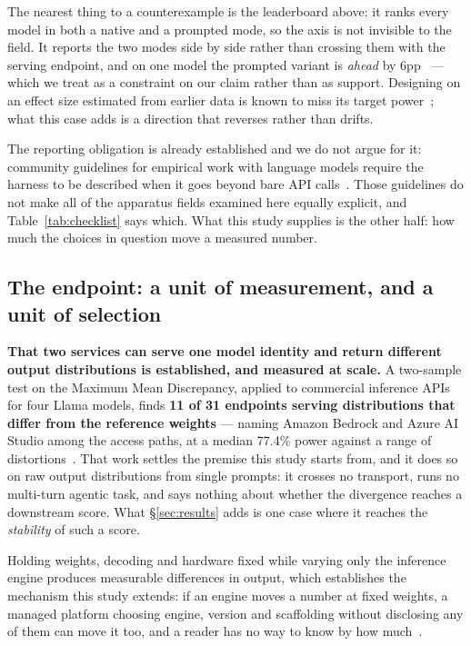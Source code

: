 The nearest thing to a counterexample is the leaderboard above: it ranks every model in both a native and a
prompted mode, so the axis is not invisible to the field. It reports the two modes side by side rather than
crossing them with the serving endpoint, and on one model the prompted variant is \emph{ahead} by
6pp~\citep{bfcl-leaderboard,bfcl-issue606} --- which we treat as a constraint on our claim rather than as
support. Designing on an effect size estimated from earlier data is known to miss its target
power~\citep{albers2018power}; what this case adds is a direction that reverses rather than drifts.

The reporting obligation is already established and we do not argue for it: community guidelines for
empirical work with language models require the harness to be described when it goes beyond bare API
calls~\citep{baltes2026guidelines}. Those guidelines do not make all of the apparatus fields examined here
equally explicit, and Table~\ref{tab:checklist} says which. What this study supplies is the other half: how much the
choices in question move a measured number.

\subsection{The endpoint: a unit of measurement, and a unit of selection}

\textbf{That two services can serve one model identity and return different output distributions is
established, and measured at scale.} A two-sample test on the Maximum Mean Discrepancy, applied to
commercial inference APIs for four Llama models, finds \textbf{11 of 31 endpoints serving distributions
that differ from the reference weights} --- naming Amazon Bedrock and Azure AI Studio among the access
paths, at a median 77.4\% power against a range of distortions~\citep{gao2025equality}. That work settles
the premise this study starts from, and it does so on raw output distributions from single prompts: it
crosses no transport, runs no multi-turn agentic task, and says nothing about whether the divergence
reaches a downstream score. What \S\ref{sec:results} adds is one case where it reaches the
\emph{stability} of such a score.

Holding weights, decoding and hardware fixed while varying only the inference engine produces measurable
differences in output, which establishes the mechanism this study extends: if an engine moves a number at fixed
weights, a managed platform choosing engine, version and scaffolding without disclosing any of them can
move it too, and a reader has no way to know by how much~\citep{silent-hyperparameter}.

